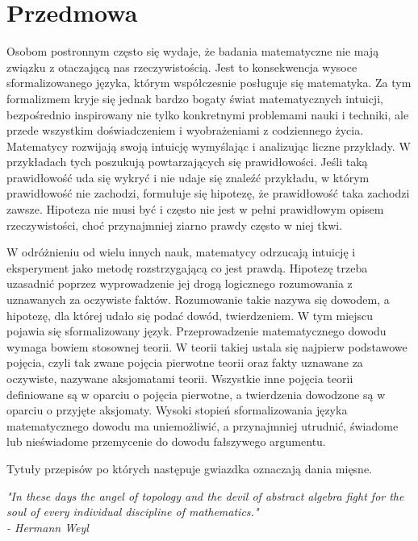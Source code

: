 \chapter*{Przedmowa}
\thispagestyle{empty}

Osobom postronnym często się wydaje, że badania matematyczne nie mają związku z otaczającą nas rzeczywistością. Jest to konsekwencja wysoce sformalizowanego języka, którym współczesnie posługuje się matematyka. Za tym formalizmem kryje się jednak bardzo bogaty świat matematycznych intuicji, bezpośrednio inspirowany nie tylko konkretnymi problemami nauki i techniki, ale przede wszystkim doświadczeniem i wyobrażeniami z codziennego życia. Matematycy rozwijają swoją intuicję wymyślając i analizując liczne przykłady. W przykładach tych poszukują powtarzających się prawidłowości. Jeśli taką prawidłowość uda się wykryć i nie udaje się znaleźć przykładu, w którym prawidłowość nie zachodzi, formułuje się hipotezę, że prawidłowość taka zachodzi zawsze. Hipoteza nie musi być i często nie jest w pełni prawidłowym opisem rzeczywistości, choć przynajmniej ziarno prawdy często w niej tkwi.

W odróżnieniu od wielu innych nauk, matematycy odrzucają intuicję i eksperyment jako metodę rozstrzygającą co jest prawdą. Hipotezę trzeba uzasadnić poprzez wyprowadzenie jej drogą logicznego rozumowania z uznawanych za oczywiste faktów. Rozumowanie takie nazywa się dowodem, a hipotezę, dla której udało się podać dowód, twierdzeniem. W tym miejscu pojawia się sformalizowany język. Przeprowadzenie matematycznego dowodu wymaga bowiem stosownej teorii. W teorii takiej ustala się najpierw podstawowe pojęcia, czyli tak zwane pojęcia pierwotne teorii oraz fakty uznawane za oczywiste, nazywane aksjomatami teorii. Wszystkie inne pojęcia teorii definiowane są w oparciu o pojęcia pierwotne, a twierdzenia dowodzone są w oparciu o przyjęte aksjomaty. Wysoki stopień sformalizowania języka matematycznego dowodu ma uniemożliwić, a przynajmniej utrudnić, świadome lub nieświadome przemycenie do dowodu fałszywego argumentu.

Tytuły przepisów po których następuje gwiazdka oznaczają dania mięsne.

\bigskip
\begin{flushright}
    \textit{"In these days the angel of topology and the devil of abstract algebra fight for the soul of every individual discipline of mathematics."} \\
    \textit{- Hermann Weyl}
\end{flushright}

\newpage